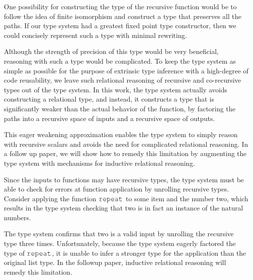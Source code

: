 \documentclass[table,dvipsnames,acmsmall]{acmart}
\theoremstyle{definition}
\begin{document}
\noindent
One possibility for constructing the type of the recursive function would
be to follow the idea of finite isomorphism and construct a type 
that preserves all the paths. If our type system had a greatest fixed point
type constructor, then we could concisely represent such a type with minimal
rewriting.


\noindent
Although the strength of precision of this type would be very beneficial,
reasoning with such a type would be complicated. To keep the type system as
simple as possible for the purpose of extrinsic type inference with a high-degree
of code reusability, we leave such relational reasoning of recursive and co-recursive types out of
the type system. 
In this work, the type system actually avoids constructing a relational type, and instead, it
constructs a type that is significantly weaker than the actual behavior of the function,
by factoring the paths into a recursive space of inputs and a recursive space of outputs. 


\noindent
This eager weakening approximation enables the type system
to simply reason with recursive scalars and avoids the need for complicated
relational reasoning. In a follow up paper,
we will show how to remedy this limitation by augmenting the type system with
mechanisms for inductive relational reasoning.

Since the inputs to functions may have recursive types, the type 
system must be able to check for errors at function application by unrolling
recursive types.
Consider applying the function $\J{repeat}$ to some item and the number two, 
which results in the type system checking that two is in fact an instance of the natural numbers.


\noindent
The type system confirms that two is a valid input by unrolling the recursive type three times.
Unfortunately, because the type system eagerly factored the type of $\J{repeat}$, it
is unable to infer a stronger type for the application than the original list type. 
In the followup paper, inductive relational reasoning will remedy this limitation.
\end{document}
